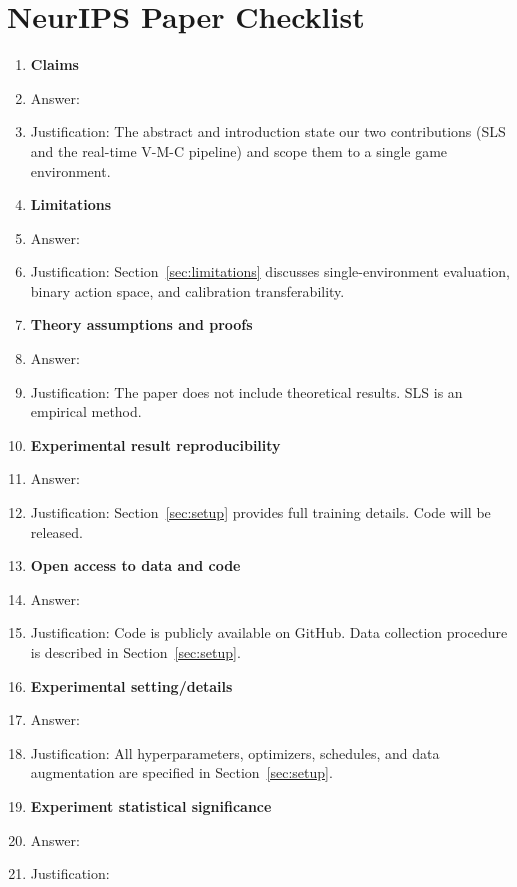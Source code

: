 \section*{NeurIPS Paper Checklist}

\begin{enumerate}

\item {\bf Claims}
    \item[] Answer: \answerYes{}
    \item[] Justification: The abstract and introduction state our two contributions (SLS and the real-time V-M-C pipeline) and scope them to a single game environment.

\item {\bf Limitations}
    \item[] Answer: \answerYes{}
    \item[] Justification: Section~\ref{sec:limitations} discusses single-environment evaluation, binary action space, and calibration transferability.

\item {\bf Theory assumptions and proofs}
    \item[] Answer: \answerNA{}
    \item[] Justification: The paper does not include theoretical results. SLS is an empirical method.

\item {\bf Experimental result reproducibility}
    \item[] Answer: \answerYes{}
    \item[] Justification: Section~\ref{sec:setup} provides full training details. Code will be released.

\item {\bf Open access to data and code}
    \item[] Answer: \answerYes{}
    \item[] Justification: Code is publicly available on GitHub. Data collection procedure is described in Section~\ref{sec:setup}.

\item {\bf Experimental setting/details}
    \item[] Answer: \answerYes{}
    \item[] Justification: All hyperparameters, optimizers, schedules, and data augmentation are specified in Section~\ref{sec:setup}.

\item {\bf Experiment statistical significance}
    \item[] Answer: \answerTODO{}
    \item[] Justification: \justificationTODO{}


\end{enumerate}
